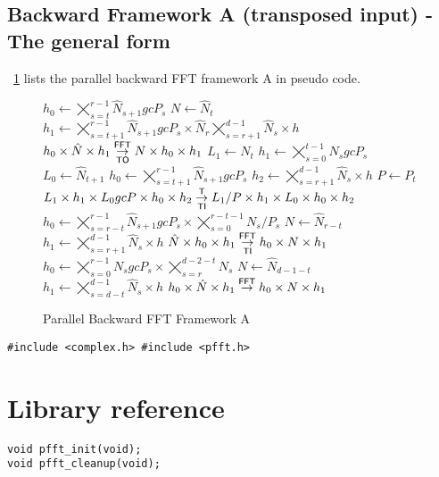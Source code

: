 \subsection{Backward Framework A (transposed input) - The general form}
\figurename{}~\ref{fig:fft_back_A} lists the parallel backward FFT framework A in pseudo code.
\begin{figure}[ht]
  \begin{algorithmic}[1]
      \State $h_0 \gets \bigtimes_{s=t}^{r-1}\hat N_{s+1}gcP_s$
      \State $N   \gets \hat N_t$
      \State $h_1 \gets \bigtimes_{s=t+1}^{r-1} \hat N_{s+1}gc P_{s} \times \hat N_{r}  \bigtimes_{s=r+1}^{d-1} \hat N_s \times h$
      \State $h_0 \times \hat N \times h_1 \overset{\textsf{FFT}}{\underset{\textsf{TO}}{\rightarrow}} N \times h_0 \times h_1$
      \State
      \State $L_1 \gets N_t$
      \State $h_1 \gets \bigtimes_{s=0}^{t-1} N_{s}gcP_{s}$
      \State $L_0 \gets \hat N_{t+1}$
      \State $h_0 \gets \bigtimes_{s=t+1}^{r-1}\hat N_{s+1}gcP_{s}$
      \State $h_2 \gets \bigtimes_{s=r+1}^{d-1} \hat N_s \times h$
      \State $P   \gets P_{t}$
      \State $L_1 \times h_1 \times L_0gcP \times h_0 \times h_2\overset{\textsf{T}}{\underset{\textsf{TI}}{\rightarrow}} L_1/P \times h_1 \times L_0 \times h_0 \times h_2$
    \EndFor
    \State $h_0 \gets \bigtimes_{s=r-t}^{r-1} \hat N_{s+1}gcP_s \times \bigtimes_{s=0}^{r-t-1} N_s/P_s$
    \State $N   \gets \hat N_{r-t}$
    \State $h_1 \gets \bigtimes_{s=r+1}^{d-1} \hat N_s \times h$
    \State $\hat N \times h_0 \times h_1 \overset{\textsf{FFT}}{\underset{\textsf{TI}}{\rightarrow}} h_0 \times N \times h_1 $
      \State $h_0 \gets \bigtimes_{s=0}^{r-1} N_sgcP_s \times \bigtimes_{s=r}^{d-2-t} N_s$
      \State $N   \gets \hat N_{d-1-t}$
      \State $h_1 \gets \bigtimes_{s=d-t}^{d-1} \hat N_s \times h$
      \State $h_0 \times \hat N \times h_1 \overset{\textsf{FFT}}{\rightarrow} h_0 \times N \times h_1$
    \EndFor
  \end{algorithmic}
  \caption{Parallel Backward FFT Framework A}\label{fig:fft_back_A}
\end{figure}


\begin{compactitem}
  \item[\mybox] \verb+#include <complex.h> #include <pfft.h>+
\end{compactitem}


\section{Library reference}
\begin{lstlisting}
void pfft_init(void);
void pfft_cleanup(void);
\end{lstlisting}

